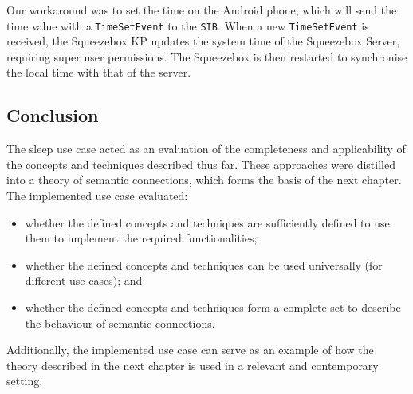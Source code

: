 Our workaround was to set the time on the Android phone, which will send the time value with a \texttt{TimeSetEvent} to the \texttt{SIB}. When a new \texttt{TimeSetEvent} is received, the Squeezebox KP updates the system time of the Squeezebox Server, requiring super user permissions. The Squeezebox is then restarted to synchronise the local time with that of the server.




\subsection{Conclusion}

The sleep use case acted as an evaluation of the completeness and applicability of the concepts and techniques described thus far. These approaches were distilled into a theory of semantic connections, which forms the basis of the next chapter. The implemented use case evaluated: 
\begin{itemize}
	\item whether the defined concepts and techniques are sufficiently defined to use them to implement the required functionalities;
	\item whether the defined concepts and techniques can be used universally (for different use cases); and
	\item  whether the defined concepts and techniques form a complete set to describe the behaviour of semantic connections.
\end{itemize}

Additionally, the implemented use case can serve as an example of how the theory described in the next chapter is used in a relevant and contemporary setting.


